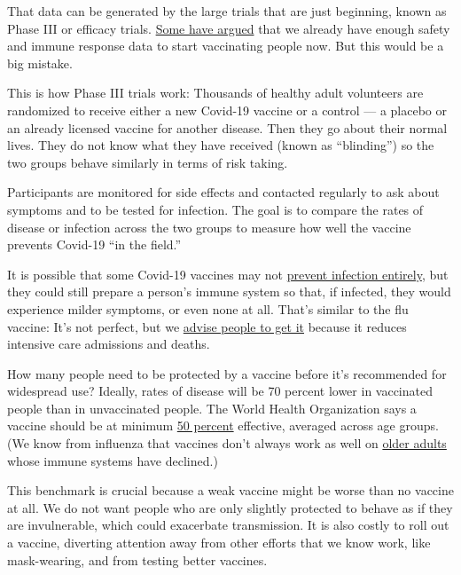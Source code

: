 That data can be generated by the large trials that are just beginning,
known as Phase III or efficacy trials.
\href{https://www.forbes.com/sites/stevensalzberg/2020/08/02/start-vaccinating-now/\#647e8baecf6e}{Some
have argued} that we already have enough safety and immune response data
to start vaccinating people now. But this would be a big mistake.

This is how Phase III trials work: Thousands of healthy adult volunteers
are randomized to receive either a new Covid-19 vaccine or a control ---
a placebo or an already licensed vaccine for another disease. Then they
go about their normal lives. They do not know what they have received
(known as ``blinding'') so the two groups behave similarly in terms of
risk taking.

Participants are monitored for side effects and contacted regularly to
ask about symptoms and to be tested for infection. The goal is to
compare the rates of disease or infection across the two groups to
measure how well the vaccine prevents Covid-19 ``in the field.''

It is possible that some Covid-19 vaccines may not
\href{https://www.biorxiv.org/content/10.1101/2020.05.13.093195v1}{prevent
infection entirely}, but they could still prepare a person's immune
system so that, if infected, they would experience milder symptoms, or
even none at all. That's similar to the flu vaccine: It's not perfect,
but we
\href{https://www.cdc.gov/flu/vaccines-work/vaccineeffect.htm}{advise
people to get it} because it reduces intensive care admissions and
deaths.

How many people need to be protected by a vaccine before it's
recommended for widespread use? Ideally, rates of disease will be 70
percent lower in vaccinated people than in unvaccinated people. The
World Health Organization says a vaccine should be at minimum
\href{https://www.who.int/blueprint/priority-diseases/key-action/WHO_Target_Product_Profiles_for_COVID-19_web.pdf}{50
percent} effective, averaged across age groups. (We know from influenza
that vaccines don't always work as well on
\href{https://www.cdc.gov/flu/spotlights/2019-2020/vaccine-stronger-immune.htm}{older
adults} whose immune systems have declined.)

This benchmark is crucial because a weak vaccine might be worse than no
vaccine at all. We do not want people who are only slightly protected to
behave as if they are invulnerable, which could exacerbate transmission.
It is also costly to roll out a vaccine, diverting attention away from
other efforts that we know work, like mask-wearing, and from testing
better vaccines.

